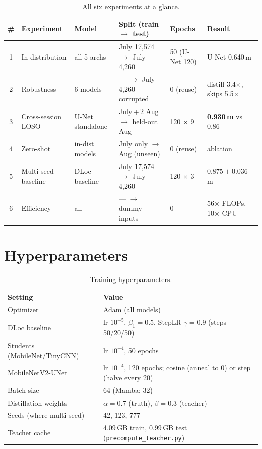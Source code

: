 \documentclass[11pt]{article}
\begin{document}
\begin{table}[h]
\centering
\footnotesize
\begin{tabular}{@{}clllll@{}}
\toprule
\textbf{\#} & \textbf{Experiment} & \textbf{Model} & \textbf{Split (train $\to$ test)} & \textbf{Epochs} & \textbf{Result} \\
\midrule
1 & In-distribution     & all 5 archs       & July 17{,}574 $\to$ July 4{,}260       & 50 (U-Net 120) & U-Net 0.640\,m \\
2 & Robustness          & 6 models          & --- $\to$ July 4{,}260 corrupted       & 0 (reuse)      & distill 3.4$\times$, skips 5.5$\times$ \\
3 & Cross-session LOSO  & U-Net standalone  & July\,+\,2 Aug $\to$ held-out Aug       & 120 $\times$ 9 & \textbf{0.930\,m} vs 0.86 \\
4 & Zero-shot           & in-dist models    & July only $\to$ Aug (unseen)           & 0 (reuse)      & ablation \\
5 & Multi-seed baseline & DLoc baseline     & July 17{,}574 $\to$ July 4{,}260        & 120 $\times$ 3 & $0.875\pm0.036$\,m \\
6 & Efficiency          & all               & --- $\to$ dummy inputs                  & 0              & 56$\times$ FLOPs, 10$\times$ CPU \\
\bottomrule
\end{tabular}
\caption{All six experiments at a glance.}
\end{table}

\section{Hyperparameters}

\begin{table}[h]
\centering
\footnotesize
\begin{tabular}{@{}ll@{}}
\toprule
\textbf{Setting} & \textbf{Value} \\
\midrule
Optimizer                 & Adam (all models) \\
DLoc baseline             & lr $10^{-5}$, $\beta_1 = 0.5$, StepLR $\gamma=0.9$ (steps 50/20/50) \\
Students (MobileNet/TinyCNN) & lr $10^{-4}$, 50 epochs \\
MobileNetV2-UNet          & lr $10^{-4}$, 120 epochs; cosine (anneal to 0) or step (halve every 20) \\
Batch size                & 64 (Mamba: 32) \\
Distillation weights      & $\alpha = 0.7$ (truth), $\beta = 0.3$ (teacher) \\
Seeds (where multi-seed)  & 42, 123, 777 \\
Teacher cache             & 4.09\,GB train, 0.99\,GB test (\texttt{precompute\_teacher.py}) \\
\bottomrule
\end{tabular}
\caption{Training hyperparameters.}
\label{tab:hparams}
\end{table}
\end{document}
